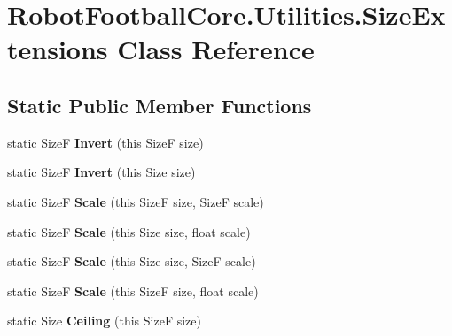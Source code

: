 \hypertarget{class_robot_football_core_1_1_utilities_1_1_size_extensions}{\section{Robot\-Football\-Core.\-Utilities.\-Size\-Extensions Class Reference}
\label{class_robot_football_core_1_1_utilities_1_1_size_extensions}
}
\subsection*{Static Public Member Functions}
\begin{DoxyCompactItemize}
\item 
\hypertarget{class_robot_football_core_1_1_utilities_1_1_size_extensions_a43f9d9afd59a3500be99fefef2408163}{static Size\-F {\bfseries Invert} (this Size\-F size)}\label{class_robot_football_core_1_1_utilities_1_1_size_extensions_a43f9d9afd59a3500be99fefef2408163}

\item 
\hypertarget{class_robot_football_core_1_1_utilities_1_1_size_extensions_a97c9d604cd7b009863279c0e942b5738}{static Size\-F {\bfseries Invert} (this Size size)}\label{class_robot_football_core_1_1_utilities_1_1_size_extensions_a97c9d604cd7b009863279c0e942b5738}

\item 
\hypertarget{class_robot_football_core_1_1_utilities_1_1_size_extensions_a5f06d3001e06146481a7299e04b46bb1}{static Size\-F {\bfseries Scale} (this Size\-F size, Size\-F scale)}\label{class_robot_football_core_1_1_utilities_1_1_size_extensions_a5f06d3001e06146481a7299e04b46bb1}

\item 
\hypertarget{class_robot_football_core_1_1_utilities_1_1_size_extensions_aee50872a31edb57c027b203ddf47c1b7}{static Size\-F {\bfseries Scale} (this Size size, float scale)}\label{class_robot_football_core_1_1_utilities_1_1_size_extensions_aee50872a31edb57c027b203ddf47c1b7}

\item 
\hypertarget{class_robot_football_core_1_1_utilities_1_1_size_extensions_a013f34e2259458b8913bcf0d51b13843}{static Size\-F {\bfseries Scale} (this Size size, Size\-F scale)}\label{class_robot_football_core_1_1_utilities_1_1_size_extensions_a013f34e2259458b8913bcf0d51b13843}

\item 
\hypertarget{class_robot_football_core_1_1_utilities_1_1_size_extensions_a0c567d3d3ab5560f8f4c74ea0761078f}{static Size\-F {\bfseries Scale} (this Size\-F size, float scale)}\label{class_robot_football_core_1_1_utilities_1_1_size_extensions_a0c567d3d3ab5560f8f4c74ea0761078f}

\item 
\hypertarget{class_robot_football_core_1_1_utilities_1_1_size_extensions_a987e7af5e0ed361e2036e39a6aeb9164}{static Size {\bfseries Ceiling} (this Size\-F size)}\label{class_robot_football_core_1_1_utilities_1_1_size_extensions_a987e7af5e0ed361e2036e39a6aeb9164}

\end{DoxyCompactItemize}


